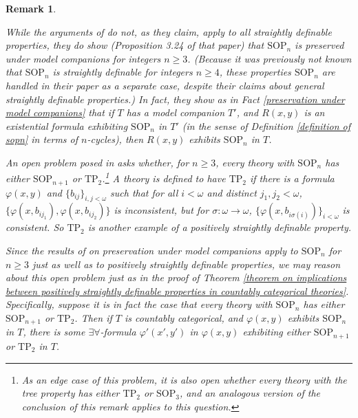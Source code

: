 \documentclass[10pt,a4paper]{amsart}
\newtheorem{remark}{Remark}
\begin{document}
\begin{remark}\label{preservation of sopn}

While the arguments of \cite{bodirsky2025taking} do not, as they claim, apply to all straightly definable properties, they do show (Proposition 3.24 of that paper) that $\mathrm{SOP}_{n}$ is preserved under model companions for integers $n \geq 3$. (Because it was previously not known that $\mathrm{SOP}_{n}$ is straightly definable for integers $n \geq 4$, these properties $\mathrm{SOP}_{n}$ are handled in their paper as a separate case, despite their claims about general straightly definable properties.) In fact, they show as in Fact \ref{preservation under model companions} that if $T$ has a model companion $T'$, and $R(x,y)$ is an existential formula exhibiting $\mathrm{SOP}_{n}$ in $T'$ (in the sense of Definition \ref{definition of sopn} in terms of $n$-cycles), then $R(x, y)$ exhibits $\mathrm{SOP}_{n}$ in $T$.


An open problem posed in \cite{chernikov2014theories} asks whether, for $n \geq 3$, every theory with $\mathrm{SOP}_{n}$ has either $\mathrm{SOP}_{n+1}$ or $\mathrm{TP}_{2}$.\footnote{As an edge case of this problem, it is also open whether every theory with the tree property has either $\mathrm{TP}_{2}$ or $\mathrm{SOP}_{3}$, and an analogous version of the conclusion of this remark applies to this question.} A theory is defined to have $\mathrm{TP}_{2}$ if there is a formula $\varphi(x, y)$ and $\{b_{ij}\}_{i, j < \omega}$ such that for all $i< \omega$ and distinct $j_{1}, j_{2}< \omega$, $\{\varphi(x, b_{ij_{1}}), \varphi(x, b_{ij_{2}})\}$ is inconsistent, but for $\sigma: \omega \to \omega$, $\{\varphi(x, b_{i\sigma(i)})\}_{i < \omega}$ is consistent. So $\mathrm{TP}_{2}$ is another example of a positively straightly definable property.

Since the results of \cite{bodirsky2025taking} on preservation under model companions apply to $\mathrm{SOP}_{n}$ for $n \geq 3$ just as well as to positively straightly definable properties, we may reason about this open problem just as in the proof of Theorem \ref{theorem on implications between positively straightly definable properties in countably categorical theories}. Specifically, suppose it is in fact the case that every theory with $\mathrm{SOP}_{n}$ has either $\mathrm{SOP}_{n+1}$ or $\mathrm{TP}_{2}$. Then if $T$ is countably categorical, and $\varphi(x, y)$ exhibits $\mathrm{SOP}_{n}$ in $T$, there is some $\exists\forall$-formula $\varphi'(x', y')$ in $\varphi(x, y)$ exhibiting either $\mathrm{SOP}_{n+1}$ or $\mathrm{TP}_{2}$ in $T$.


\end{remark}
\end{document}
